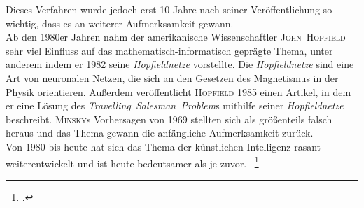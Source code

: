 Dieses Verfahren wurde jedoch erst 10 Jahre nach seiner Veröffentlichung so wichtig, dass es an weiterer Aufmerksamkeit gewann.\\
Ab den 1980er Jahren nahm der amerikanische Wissenschaftler \textsc{John~Hopfield} sehr viel Einfluss auf das mathematisch-informatisch geprägte Thema, unter anderem indem er 1982 seine \textit{Hopfieldnetze} vorstellte.
Die \textit{Hopfieldnetze} sind eine Art von neuronalen Netzen, die sich an den Gesetzen des Magnetismus in der Physik orientieren.
Außerdem veröffentlicht \textsc{Hopfield} 1985 einen Artikel, in dem er eine Lösung des \textit{Travelling~Salesman~Problem}s mithilfe seiner \textit{Hopfieldnetze} beschreibt.
\textsc{Minsky}s Vorhersagen von 1969 stellten sich als größenteils falsch heraus und das Thema gewann die anfängliche Aufmerksamkeit zurück.\\
Von 1980 bis heute hat sich das Thema der künstlichen Intelligenz rasant weiterentwickelt und ist heute bedeutsamer als je zuvor.
~\footcite[][Abschnitt 1.2]{kriesel}